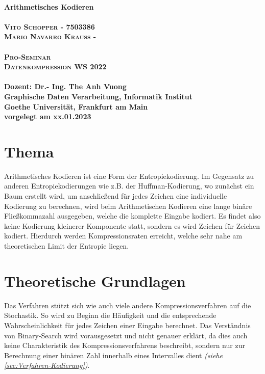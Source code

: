 \documentclass[a4paper]{article}
\theoremstyle{definition}
\theoremstyle{remark}
\begin{document}
	\begin{titlepage}
	
	\begin{center}

		\huge \textbf{\textsf{
		\\Arithmetisches Kodieren}} \\
		\LARGE\textbf{\textsc{\\
		Vito Schopper - 7503386
		\\
		Mario Navarro Krauß - }}\\ 
		\vspace{2cm}
		\LARGE\textbf{\textsc{\\Pro-Seminar
		\\ Datenkompression WS 2022}}\\ 
		\vspace{2.5cm}
		\large \textbf{
		\\
				Dozent: {Dr.- Ing. The Anh Vuong} \\
Graphische Daten Verarbeitung, Informatik Institut
\\
Goethe Universität, Frankfurt am Main
\\
vorgelegt am xx.01.2023 %
}
	\end{center}
\end{titlepage}
\tableofcontents\newpage
	
\section{Thema}
\label{sec:Thema}
Arithmetisches Kodieren ist eine Form der Entropiekodierung. Im Gegensatz zu anderen Entropiekodierungen wie z.B. der Huffman-Kodierung, wo zunächst ein Baum erstellt wird, um anschließend für jedes Zeichen eine individuelle Kodierung zu berechnen, wird beim Arithmetischen Kodieren eine lange binäre Fließkommazahl ausgegeben, welche die komplette Eingabe kodiert. Es findet also keine Kodierung kleinerer Komponente statt, sondern es wird Zeichen für Zeichen kodiert. Hierdurch werden Kompressionsraten erreicht, welche sehr nahe am theoretischen Limit der Entropie liegen.\cite{WIKI}

		\section{Theoretische Grundlagen}
Das Verfahren stützt sich wie auch viele andere Kompressionsverfahren auf die Stochastik. So wird zu Beginn die Häufigkeit und die entsprechende Wahrscheinlichkeit für jedes Zeichen einer Eingabe berechnet. Das Verständnis von Binary-Search wird vorausgesetzt und nicht genauer erklärt, da dies auch keine Charakteristik des Kompressionsverfahrens beschreibt, sondern nur zur Berechnung einer binären Zahl innerhalb eines Intervalles dient \textit{(siehe \ref{sec:Verfahren-Kodierung})}.
\end{document}

